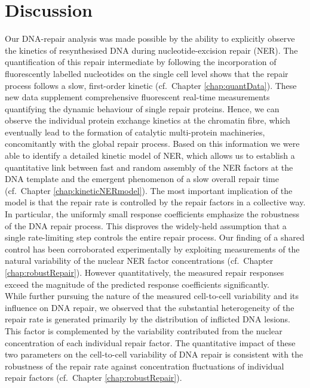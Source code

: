 \chapter{Discussion}


Our DNA-repair analysis was made possible by the ability to explicitly observe the kinetics of resynthesised DNA during nucleotide-excision repair (NER). The quantification of this repair intermediate by following the incorporation of fluorescently labelled nucleotides on the single cell level shows that the repair process follows a slow, first-order kinetic (cf.\ Chapter \ref{chap:quantData}). These new data supplement comprehensive fluorescent real-time measurements quantifying the dynamic behaviour of single repair proteins. Hence, we can observe the individual protein exchange kinetics at the chromatin fibre, which eventually lead to the formation of catalytic multi-protein machineries, concomitantly with the global repair process. Based on this information we were able to identify a detailed kinetic model of NER, which allows us to establish a quantitative link between fast and random assembly of the NER factors at the DNA template and the emergent phenomenon of a slow overall repair time (cf.\ Chapter \ref{chap:kineticNERmodel}). The most important implication of the model is that the repair rate is controlled by the repair factors in a collective way. In particular, the uniformly small response coefficients emphasize the robustness of the DNA repair process. This disproves the widely-held assumption that a single rate-limiting step controls the entire repair process. Our finding of a shared control has been corroborated experimentally by exploiting measurements of the natural variability of the nuclear NER factor concentrations (cf.\ Chapter \ref{chap:robustRepair}). However quantitatively, the measured repair responses exceed the magnitude of the predicted response coefficients significantly.\\
While further pursuing the nature of the measured cell-to-cell variability and its influence on DNA repair, we observed that the substantial heterogeneity of the repair rate is generated primarily by the distribution of inflicted DNA lesions. This factor is complemented by the variability contributed from the nuclear concentration of each individual repair factor. The quantitative impact of these two parameters on the cell-to-cell variability of DNA repair is consistent with the robustness of the repair rate against concentration fluctuations of individual repair factors (cf.\ Chapter \ref{chap:robustRepair}).\\  

